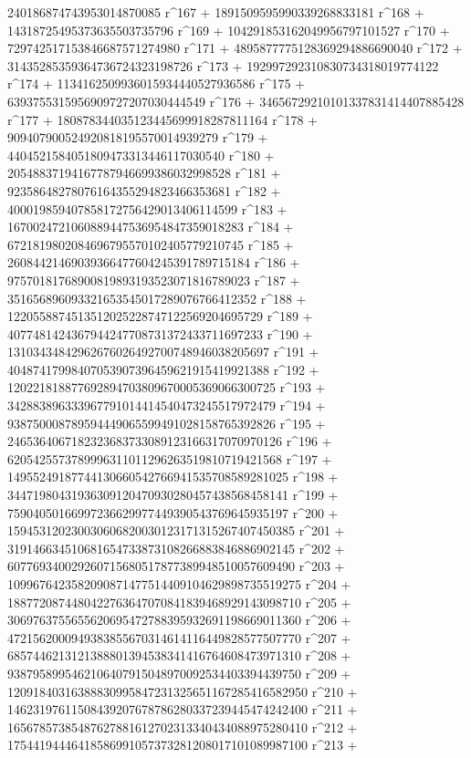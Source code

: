        240186874743953014870085 r^167 + 
       1891509595990339268833181 r^168 + 
       14318725495373635503735796 r^169 + 
       104291853162049956797101527 r^170 + 
       729742517153846687571274980 r^171 + 
       4895877775128369294886690040 r^172 + 
       31435285359364736724323198726 r^173 + 
       192997292310830734318019774122 r^174 + 
       1134162509936015934440527936586 r^175 + 
       6393755315956909727207030444549 r^176 + 
       34656729210101337831414407885428 r^177 + 
       180878344035123445699918287811164 r^178 + 
       909407900524920818195570014939279 r^179 + 
       4404521584051809473313446117030540 r^180 + 
       20548837194167787946699386032998528 r^181 + 
       92358648278076164355294823466353681 r^182 + 
       400019859407858172756429013406114599 r^183 + 
       1670024721060889447536954847359018283 r^184 + 
       6721819802084696795570102405779210745 r^185 + 
       26084421469039366477604245391789715184 r^186 + 
       97570181768900819893193523071816789023 r^187 + 
       351656896093321653545017289076766412352 r^188 + 
       1220558874513512025228747122569204695729 r^189 + 
       4077481424367944247708731372433711697233 r^190 + 
       13103434842962676026492700748946038205697 r^191 + 
       40487417998407053907396459621915419921388 r^192 + 
       120221818877692894703809670005369066300725 r^193 + 
       342883896333967791014414540473245517972479 r^194 + 
       938750008789594449065599491028158765392826 r^195 + 
       2465364067182323683733089123166317070970126 r^196 + 
       6205425573789996311011296263519810719421568 r^197 + 
       14955249187744130660542766941535708589281025 r^198 + 
       34471980431936309120470930280457438568458141 r^199 + 
       75904050166997236629977449390543769645935197 r^200 + 
       159453120230030606820030123171315267407450385 r^201 + 
       319146634510681654733873108266883846886902145 r^202 + 
       607769340029260715680517877389948510057609490 r^203 + 
       1099676423582090871477514409104629898735519275 r^204 + 
       1887720874480422763647070841839468929143098710 r^205 + 
       3069763755655620695472788395932691198669011360 r^206 + 
       4721562000949383855670314614116449828577507770 r^207 + 
       6857446213121388801394538341416764608473971310 r^208 + 
       9387958995462106407915048970092534403394439750 r^209 + 
       12091840316388830995847231325651167285416582950 r^210 + 
       14623197611508439207678786280337239445474242400 r^211 + 
       16567857385487627881612702313340434088975280410 r^212 + 
       17544194446418586991057373281208017101089987100 r^213 + 
